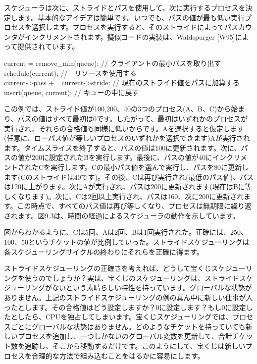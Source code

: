 スケジューラは次に、ストライドとパスを使用して、次に実行するプロセスを決定します。基本的なアイデアは簡単です。いつでも、パスの値が最も低い実行プロセスを選択します。プロセスを実行すると、そのストライドによってパスカウンタがインクリメントされます。擬似コードの実装は、Waldspurger
{[}W95{]}によって提供されています。

current = remove\_min(queue); // クライアントの最小パスを取り出す\\
schedule(current); //　リソースを使用する\\
current-\textgreater pass += current-\textgreater stride; //
現在のストライド値をパスに加算する\\
insert(queue, current); // キューの中に戻す

この例では、ストライド値が100,200、40の3つのプロセス(A、B、C)から始まり、パスの値はすべて最初は0です。したがって、最初はいずれかのプロセスが実行され、それらの合格値も同様に低いからです。Aを選択すると仮定します(任意に、ローパス値が等しいプロセスのいずれかを選択できます)Aが実行されます。タイムスライスを終了すると、パスの値は100に更新されます。次に、パスの値が200に設定されたBを実行します。最後に、パスの値が40にインクリメントされたCを実行します。Cの最小パス値を選んで実行し、パスを80に更新します(Cのストライドは40です)。その後、Cは再び実行され(最低のパス値)、パスは120に上がります。次にAが実行され、パスは200に更新されます(現在はBに等しくなります)。次に、Cは2回以上実行され、パスは160、次に200に更新されます。この時点で、すべてのパス値は再び等しくなり、プロセスは無期限に繰り返されます。図9.3は、時間の経過によるスケジューラの動作を示しています。

図からわかるように、Cは5回、Aは2回、Bは1回実行された。正確には、250、100、50というチケットの値が比例していった。ストライドスケジューリングは各スケジューリングサイクルの終わりにそれらを正確に得ます。

ストライドスケジューリングの正確さを考えれば、どうして宝くじスケジューリングを使うのでしょうか？実は、宝くじのスケジューリングは、ストライドスケジューリングがないという素晴らしい特性を持っています。グローバルな状態がありません。上記のストライドスケジューリングの例の真ん中に新しい仕事が入ったとします。その合格値はどう設定しますか？0に設定します？もし0に設定したとしたら、CPUを独占してしまいます。宝くじスケジューリングでは、プロセスごとにグローバルな状態はありません。どのようなチケットを持っていても新しいプロセスを追加し、一つしかないのグローバル変数を更新して、合計チケット数を追跡し、そこから移動するだけです。このようにして、宝くじは新しいプロセスを合理的な方法で組み込むことをはるかに容易にします。

